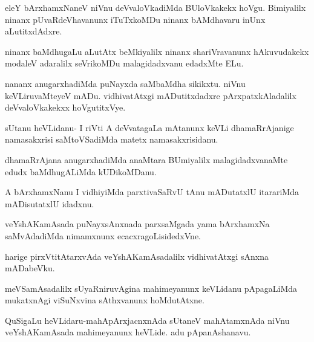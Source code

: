 \documentclass{article}
\begin{document}
\begin{mn}%
eleY bArxhamxNaneV niVnu deVvaloVkadiMda BUloVkakekx hoVgu. Bimiyalilx ninanx 
pUvaRdeVhavanunx iTuTxkoMDu ninanx bAMdhavaru inUnx aLutitxdAdxre.
\end{mn}

\begin{mn}%
ninanx baMdhugaLu aLutAtx beMkiyalilx ninanx shariVravanunx hAkuvudakekx modaleV adaralilx 
seVrikoMDu malagidadxvanu edadxMte ELu.
\end{mn}

\begin{mn}%
nananx anugarxhadiMda puNayxda saMbaMdha sikikxtu. niVnu keVLiruvaMteyeV mADu. 
vidhivatAtxgi mADutitxdadxre pArxpatxkAladalilx deVvaloVkakekxx hoVgutitxVye.
\end{mn}

\begin{mn}%
sUtanu heVLidanu- I riVti A deVvatagaLa mAtanunx keVLi dhamaRrAjanige namasakxrisi 
saMtoVSadiMda matetx namasakxrisidanu.
\end{mn}

\begin{mn}%
dhamaRrAjana anugarxhadiMda anaMtara BUmiyalilx malagidadxvanaMte edudx baMdhugALiMda 
kUDikoMDanu.
\end{mn}

\begin{mn}%
A bArxhamxNanu I vidhiyiMda parxtivaSaRvU  tAnu mADutatxlU itarariMda mADisutatxlU idadxnu.
\end{mn}

\begin{mn}%
veYshAKamAsada puNayxsAnxnada parxsaMgada yama bArxhamxNa saMvAdadiMda nimamxnunx 
ecacxragoLisidedxVne.
\end{mn}

\begin{mn}%
harige pirxVtitAtarxvAda veYshAKamAsadalilx vidhivatAtxgi sAnxna mADabeVku.
\end{mn}

\begin{mn}%
meVSamAsadalilx sUyaRniruvAgina mahimeyanunx keVLidanu pApagaLiMda mukatxnAgi viSuNxvina 
sAthxvanunx hoMdutAtxne.
\end{mn}

\begin{mn}%
QuSigaLu heVLidaru-mahApArxjacnxnAda sUtaneV mahAtamxnAda niVnu veYshAKamAsada 
mahimeyanunx heVLide. adu pApanAshanavu.
\end{mn}
\end{document}
